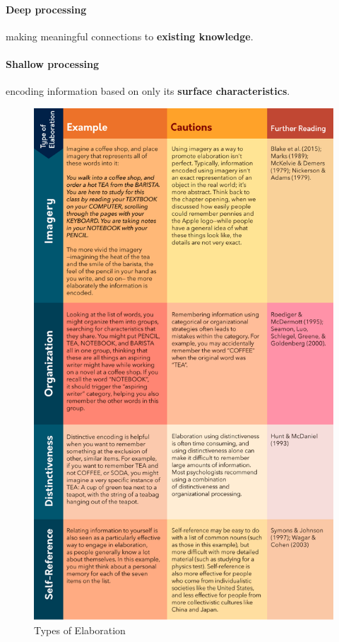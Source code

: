 \documentclass{article}
\begin{document}
	\paragraph{Deep processing} making meaningful connections to \textbf{existing knowledge}.
	\paragraph{Shallow processing} encoding information based on only its \textbf{surface characteristics}.
	\begin{figure}
		\centering
		\includegraphics[width = \linewidth]{pic/elaboration_types}
		\caption{Types of Elaboration}
	\end{figure}
\end{document}

